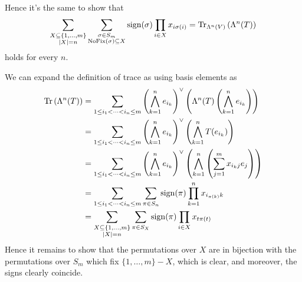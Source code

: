 \begin{problem}
\begin{sol}
		Hence it's the same to show that
		\[
			\sum_{\substack{X \subseteq \{1, \dots, m\} \\ \left\lvert X \right\rvert = n} }
			\sum_{\substack{\sigma \in S_m \\ \operatorname{NoFix}(\sigma) \subseteq X}}
			\operatorname{sign}(\sigma) \prod_{i \in X} x_{i \sigma(i)}
			= \operatorname{Tr}_{\Lambda^n(V)} \left( \Lambda^n(T) \right)
		\]
		holds for every $n$.

		We can expand the definition of trace as using basis elements as
		\begin{align*}
			\operatorname{Tr}\left( \Lambda^n(T) \right)
			&= \sum_{1 \le i_1 < \dots < i_n \le m}
			\left( \bigwedge_{k=1}^n e_{i_k} \right)^\vee
			\left( \Lambda^n(T) \left( \bigwedge_{k=1}^n e_{i_k} \right) \right) \\
			&= \sum_{1 \le i_1 < \dots < i_n \le m}
			\left( \bigwedge_{k=1}^n e_{i_k} \right)^\vee
			\left(  \bigwedge_{k=1}^n T(e_{i_k}) \right) \\
			&= \sum_{1 \le i_1 < \dots < i_n \le m}
			\left( \bigwedge_{k=1}^n e_{i_k} \right)^\vee
			\left(  \bigwedge_{k=1}^n
			\left( \sum_{j=1}^m x_{i_k j} e_j \right)
			\right) \\
			&= \sum_{1 \le i_1 < \dots < i_n \le m}
			\sum_{\pi \in S_n} \operatorname{sign}(\pi) \prod_{k=1}^n x_{i_{\pi(k)}k} \\
			&= \sum_{\substack{X \subseteq \{1,\dots,m\} \\ \left\lvert X \right\rvert = n}}
			\sum_{\pi \in S_X} \operatorname{sign}(\pi) \prod_{i \in X} x_{t \pi(t)}
		\end{align*}
		Hence it remains to show that the permutations over $X$
		are in bijection with the permutations over $S_m$ which fix $\{1, \dots, m\} - X$,
		which is clear, and moreover, the signs clearly coincide.
	\end{sol}
\end{problem}
